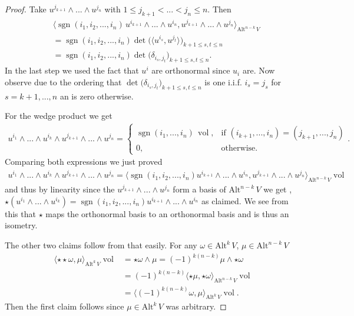 \documentclass[12pt,a4paper]{article}
\numberwithin{equation}{subsection}
\numberwithin{lemma}{subsection}
\theoremstyle{definition}
\DeclareMathOperator{\sgn}{sgn}
\DeclareMathOperator{\vol}{vol}
\newcommand{\alternating}[2]{ {\text{Alt}^{#1}\,#2} }
\begin{document}
\begin{proof}
    Take $u^{j_{k+1}} \wedge ... \wedge u^{j_n}$ with 
    $1 \leq j_{k+1} < ... < j_n \leq n$. Then 
    \begin{align*}
        &\langle \sgn(i_1,i_2,...,i_n) \, u^{i_{k+1}} \wedge ... \wedge u^{i_{n}},
            u^{j_{k+1}} \wedge ... \wedge u^{j_{n}} \rangle_{\alternating{n-k}{V}}
        \\ &= \sgn(i_1,i_2,...,i_n) \det \big( \langle u^{i_s}, u^{j_t} \rangle \big)_{k+1 \leq s,t \leq n}
        \\ &= \sgn(i_1,i_2,...,i_n) \det \big( \delta_{i_s,j_t} \big)_{k+1 \leq s,t \leq n}.
    \end{align*}
    In the last step we used the fact that $u^i$ are orthonormal since $u_i$ 
    are. Now observe due to the ordering that 
    $\det \big( \delta_{i_s,j_t} \big)_{k+1 \leq s,t \leq n}$ is one i.i.f.
    $i_s = j_s$ for $s = k+1,...,n$ an is zero otherwise.

    For the wedge product we get
    \begin{align*}
        u^{i_1} \wedge ... \wedge u^{i_{k}} \wedge u^{j_{k+1}} \wedge ... 
            \wedge u^{j_n}
        =   \begin{cases}
                \sgn(i_1, ..., i_n)\, \vol, & \text{if $(i_{k+1},...,i_n) = (j_{k+1},...,j_n)$} \\
                0,  & \text{otherwise.}
            \end{cases}.
    \end{align*}
    Comparing both expressions we just proved
    \begin{align*}
        u^{i_1} \wedge ... \wedge u^{i_{k}} \wedge u^{j_{k+1}} \wedge ... \wedge u^{j_n}
        = \langle \sgn(i_1,i_2,...,i_n) u^{i_{k+1}} \wedge ... \wedge u^{i_{n}},
            u^{j_{k+1}} \wedge ... \wedge u^{j_{n}} \rangle_{\alternating{n-k}{V}} \vol
    \end{align*}
    and thus by linearity since the $u^{j_{k+1}} \wedge ... 
    \wedge u^{j_n}$ form a basis of $\alternating{n-k}{V}$ we get , 
    $\star (u^{i_1} \wedge ... \wedge u^{i_{k}}) = 
    \sgn(i_1,i_2,...,i_n) u^{i_{k+1}} \wedge ... \wedge u^{i_{n}}$ as claimed.
    We see from this that $\star$ maps the orthonormal basis to an orthonormal
    basis and is thus an isometry.

    The other two claims follow from that easily. For any $\omega \in 
    \alternating{k}{V}$, $\mu \in \alternating{n-k}{V}$
    \begin{align*}
        \langle \star \star \omega , \mu \rangle_{\alternating{k}{V}}\vol
        &= \star \omega \wedge \mu
        = (-1)^{k(n-k)} \mu \wedge \star \omega 
        \\ &= (-1)^{k(n-k)} \langle \star \mu , \star \omega \rangle_{\alternating{n-k}{V}} \vol
        \\ &= \langle (-1)^{k(n-k)} \omega , \mu \rangle_{\alternating{k}{V}} \vol.
    \end{align*}
    Then the first claim follows since $\mu \in \alternating{k}{V}$ was
    arbitrary.


\end{proof}
\end{document}

